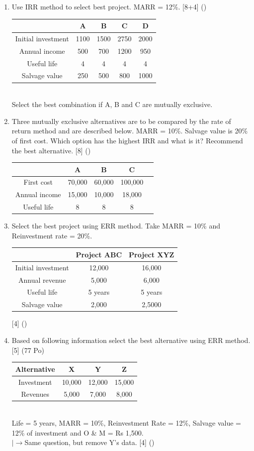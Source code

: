 \documentclass[12pt]{article}
\newcommand{\lb}{\\ $\left|\rightarrow\right.$}
\begin{document}
\begin{enumerate}
			\item Use IRR method to select best project. MARR = 12\%. \hfill [8+4] ()
			\begin{tabular}{|c|c|c|c|c|}
				\hline
				& A & B & C & D \\ \hline
				Initial investment & 1100 & 1500 & 2750 & 2000 \\ \hline
				Annual income & 500 & 700 & 1200 & 950 \\ \hline
				Useful life & 4 & 4 & 4 & 4 \\ \hline
				Salvage value & 250 & 500 & 800 & 1000 \\ \hline
			\end{tabular}\\
			Select the best combination if A, B and C are mutually exclusive.
			
			\item Three mutually exclusive alternatives are to be compared by the rate of return method and are described below. MARR = 10\%. Salvage value is 20\% of first cost. Which option has the highest IRR and what is it? Recommend the best alternative. \hfill [8] ()\\
			\begin{tabular}{|c|c|c|c|c|}
				\hline
				& A & B & C \\ \hline
				First cost & 70,000 & 60,000 & 100,000 \\ \hline
				Annual income & 15,000 & 10,000 & 18,000 \\ \hline
				Useful life & 8 & 8 & 8 \\ \hline
			\end{tabular}

			\item Select the best project using ERR method. Take MARR = 10\% and Reinvestment rate = 20\%.\\
			\begin{tabular}{|c|c|c|}
				\hline
				& Project ABC & Project XYZ \\ \hline
				Initial investment & 12,000 & 16,000 \\ \hline
				Annual revenue & 5,000 & 6,000 \\ \hline
				Useful life & 5 years & 5 years \\ \hline
				Salvage value & 2,000 & 2,5000 \\ \hline
			\end{tabular}  \hfill [4] ()

			\item Based on following information select the best alternative using ERR method. \hfill [5] (77 Po)
			\begin{tabular}{|c|c|c|c|}
				\hline
				Alternative & X & Y & Z \\ \hline
				Investment & 10,000 & 12,000 & 15,000 \\ \hline
				Revenues & 5,000 & 7,000 & 8,000 \\ \hline
			\end{tabular}\\
			Life = 5 years, MARR = 10\%, Reinvestment Rate = 12\%, Salvage value = 12\% of investment and O \& M = Rs 1,500.
			\lb Same question, but remove Y's data. \hfill [4] () 
			

\end{enumerate}
\end{document}
